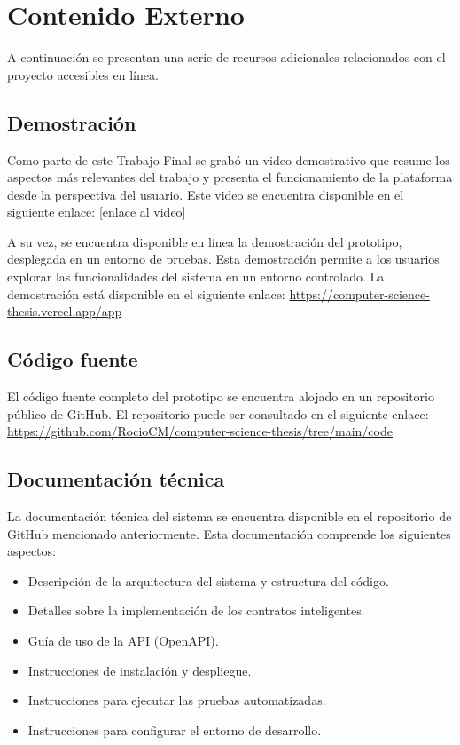 \chapter{Contenido Externo}
\label{cp:annex-content}

\parindent0pt

A continuación se presentan una serie de recursos adicionales relacionados con el proyecto accesibles en línea.

\section{Demostración}
\label{sec:results-demo}

Como parte de este Trabajo Final se grabó un video demostrativo que resume los aspectos más relevantes del trabajo y presenta el funcionamiento de la plataforma desde la perspectiva del usuario. Este video se encuentra disponible en el siguiente enlace: 
\href{enlace al video}{[enlace al video]} %

A su vez, se encuentra disponible en línea la demostración del prototipo, desplegada en un entorno de pruebas. Esta demostración permite a los usuarios explorar las funcionalidades del sistema en un entorno controlado. La demostración está disponible en el siguiente enlace: \href{https://computer-science-thesis.vercel.app/app}{https://computer-science-thesis.vercel.app/app}

\section{Código fuente}
\label{sec:source-code}

El código fuente completo del prototipo se encuentra alojado en un repositorio público de GitHub. El repositorio puede ser consultado en el siguiente enlace: \href{https://github.com/RocioCM/computer-science-thesis/tree/main/code}{https://github.com/RocioCM/computer-science-thesis/tree/main/code}

\section{Documentación técnica}
\label{sec:technical-docs}

La documentación técnica del sistema se encuentra disponible en el repositorio de GitHub mencionado anteriormente. Esta documentación comprende los siguientes aspectos:

\begin{itemize}
	\item Descripción de la arquitectura del sistema y estructura del código.
	\item Detalles sobre la implementación de los contratos inteligentes.
	\item Guía de uso de la API (OpenAPI).
	\item Instrucciones de instalación y despliegue.
	\item Instrucciones para ejecutar las pruebas automatizadas.
	\item Instrucciones para configurar el entorno de desarrollo.
\end{itemize}

